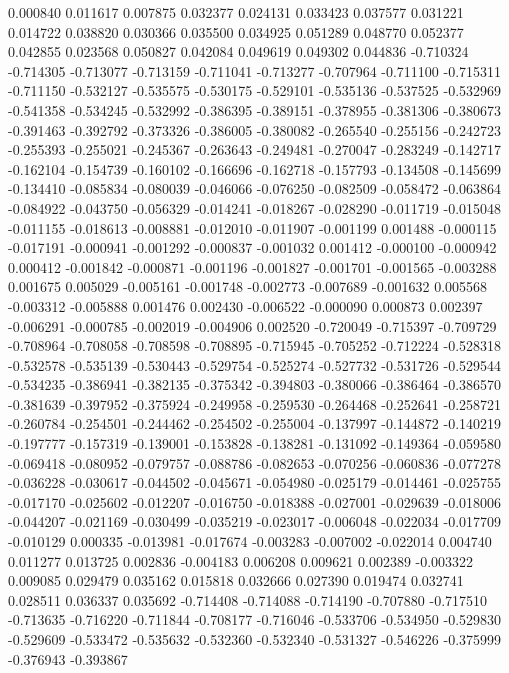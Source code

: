 0.000840
0.011617
0.007875
0.032377
0.024131
0.033423
0.037577
0.031221
0.014722
0.038820
0.030366
0.035500
0.034925
0.051289
0.048770
0.052377
0.042855
0.023568
0.050827
0.042084
0.049619
0.049302
0.044836
-0.710324
-0.714305
-0.713077
-0.713159
-0.711041
-0.713277
-0.707964
-0.711100
-0.715311
-0.711150
-0.532127
-0.535575
-0.530175
-0.529101
-0.535136
-0.537525
-0.532969
-0.541358
-0.534245
-0.532992
-0.386395
-0.389151
-0.378955
-0.381306
-0.380673
-0.391463
-0.392792
-0.373326
-0.386005
-0.380082
-0.265540
-0.255156
-0.242723
-0.255393
-0.255021
-0.245367
-0.263643
-0.249481
-0.270047
-0.283249
-0.142717
-0.162104
-0.154739
-0.160102
-0.166696
-0.162718
-0.157793
-0.134508
-0.145699
-0.134410
-0.085834
-0.080039
-0.046066
-0.076250
-0.082509
-0.058472
-0.063864
-0.084922
-0.043750
-0.056329
-0.014241
-0.018267
-0.028290
-0.011719
-0.015048
-0.011155
-0.018613
-0.008881
-0.012010
-0.011907
-0.001199
0.001488
-0.000115
-0.017191
-0.000941
-0.001292
-0.000837
-0.001032
0.001412
-0.000100
-0.000942
0.000412
-0.001842
-0.000871
-0.001196
-0.001827
-0.001701
-0.001565
-0.003288
0.001675
0.005029
-0.005161
-0.001748
-0.002773
-0.007689
-0.001632
0.005568
-0.003312
-0.005888
0.001476
0.002430
-0.006522
-0.000090
0.000873
0.002397
-0.006291
-0.000785
-0.002019
-0.004906
0.002520
-0.720049
-0.715397
-0.709729
-0.708964
-0.708058
-0.708598
-0.708895
-0.715945
-0.705252
-0.712224
-0.528318
-0.532578
-0.535139
-0.530443
-0.529754
-0.525274
-0.527732
-0.531726
-0.529544
-0.534235
-0.386941
-0.382135
-0.375342
-0.394803
-0.380066
-0.386464
-0.386570
-0.381639
-0.397952
-0.375924
-0.249958
-0.259530
-0.264468
-0.252641
-0.258721
-0.260784
-0.254501
-0.244462
-0.254502
-0.255004
-0.137997
-0.144872
-0.140219
-0.197777
-0.157319
-0.139001
-0.153828
-0.138281
-0.131092
-0.149364
-0.059580
-0.069418
-0.080952
-0.079757
-0.088786
-0.082653
-0.070256
-0.060836
-0.077278
-0.036228
-0.030617
-0.044502
-0.045671
-0.054980
-0.025179
-0.014461
-0.025755
-0.017170
-0.025602
-0.012207
-0.016750
-0.018388
-0.027001
-0.029639
-0.018006
-0.044207
-0.021169
-0.030499
-0.035219
-0.023017
-0.006048
-0.022034
-0.017709
-0.010129
0.000335
-0.013981
-0.017674
-0.003283
-0.007002
-0.022014
0.004740
0.011277
0.013725
0.002836
-0.004183
0.006208
0.009621
0.002389
-0.003322
0.009085
0.029479
0.035162
0.015818
0.032666
0.027390
0.019474
0.032741
0.028511
0.036337
0.035692
-0.714408
-0.714088
-0.714190
-0.707880
-0.717510
-0.713635
-0.716220
-0.711844
-0.708177
-0.716046
-0.533706
-0.534950
-0.529830
-0.529609
-0.533472
-0.535632
-0.532360
-0.532340
-0.531327
-0.546226
-0.375999
-0.376943
-0.393867
